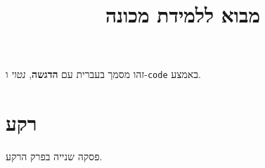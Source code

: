 \documentclass[11pt,a4paper]{article}
\title{מבוא ללמידת מכונה}
\date{}
\begin{document}
\maketitle

זהו מסמך בעברית עם \textbf{הדגשה}, \emph{נטוי} ו-\foreignlanguage{english}{\texttt{code}} באמצע.

\section{רקע}

פסקה שנייה בפרק הרקע.
\end{document}
